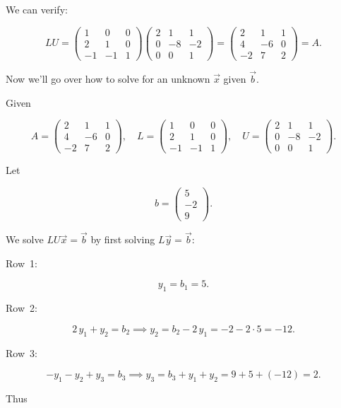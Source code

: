 \documentclass{article}
\begin{document}
We can verify:

\[ LU
=
\begin{pmatrix}
1 & 0 & 0 \\
2 & 1 & 0 \\
-1 & -1 & 1
\end{pmatrix}
\begin{pmatrix}
2 & 1 & 1 \\
0 & -8 & -2 \\
0 & 0 & 1
\end{pmatrix}
=
\begin{pmatrix}
2 & 1 & 1 \\
4 & -6 & 0 \\
-2 & 7 & 2
\end{pmatrix}
= A. \]

Now we'll go over how to solve for an unknown $\vec{x}$ given $\vec{b}.$

Given

\[ A = \begin{pmatrix}
2 & 1 & 1 \\
4 & -6 & 0 \\
-2 & 7 & 2
\end{pmatrix},
\quad
L = \begin{pmatrix}
1 & 0 & 0 \\
2 & 1 & 0 \\
-1 & -1 & 1
\end{pmatrix},
\quad
U = \begin{pmatrix}
2 & 1 & 1 \\
0 & -8 & -2 \\
0 & 0 & 1
\end{pmatrix}. \]

Let

\[ b = \begin{pmatrix} 5 \\ -2 \\ 9 \end{pmatrix}. \]

We solve $LU \vec{x} = \vec{b}$ by first solving $L \vec{y} = \vec{b}$:

Row 1:

\[ y_1 = b_1 = 5. \]

Row 2:

\[ 2\,y_1 + y_2 = b_2 \implies y_2 = b_2 - 2\,y_1 = -2 - 2\cdot5 = -12. \]

Row 3:  

\[ -y_1 - y_2 + y_3 = b_3 \implies y_3 = b_3 + y_1 + y_2 = 9 + 5 + (-12) = 2. \]

Thus
\end{document}
